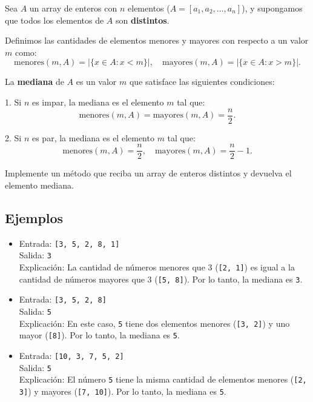Sea \( A \) un array de enteros con \( n \) elementos (\( A = [a_1, a_2, \dots, a_n] \)), y supongamos que todos los elementos de \( A \) son \textbf{distintos}.

Definimos las cantidades de elementos menores y mayores con respecto a un valor \( m \) como:
\[
\text{menores}(m, A) = \lvert \{x \in A : x < m\} \rvert, \quad 
\text{mayores}(m, A) = \lvert \{x \in A : x > m\} \rvert.
\]

La \textbf{mediana} de \( A \) es un valor \( m \) que satisface las siguientes condiciones:

1. Si \( n \) es impar, la mediana es el elemento \( m \) tal que:
\[
\text{menores}(m, A) = \text{mayores}(m, A) = \frac{n}{2}.
\]

2. Si \( n \) es par, la mediana es el elemento \( m \) tal que:
\[
\text{menores}(m, A) = \frac{n}{2}, \quad 
\text{mayores}(m, A) = \frac{n}{2} - 1.
\]

Implemente un método que reciba un array de enteros distintos y devuelva el elemento mediana. 

\subsection*{Ejemplos}
\begin{itemize}
    \item Entrada: \texttt{[3, 5, 2, 8, 1]}\\
    Salida: \texttt{3}\\
    Explicación: La cantidad de números menores que 3 (\texttt{[2, 1]}) es igual a la cantidad de números mayores que 3 (\texttt{[5, 8]}). Por lo tanto, la mediana es \texttt{3}.
    
    \item Entrada: \texttt{[3, 5, 2, 8]}\\
    Salida: \texttt{5}\\
    Explicación: En este caso, \texttt{5} tiene dos elementos menores (\texttt{[3, 2]}) y uno mayor (\texttt{[8]}). Por lo tanto, la mediana es \texttt{5}.
    
    \item Entrada: \texttt{[10, 3, 7, 5, 2]}\\
    Salida: \texttt{5}\\
    Explicación: El número \texttt{5} tiene la misma cantidad de elementos menores (\texttt{[2, 3]}) y mayores (\texttt{[7, 10]}). Por lo tanto, la mediana es \texttt{5}.
\end{itemize}